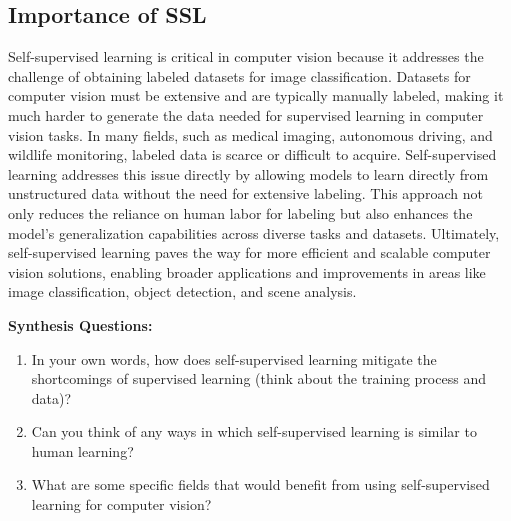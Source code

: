 \subsection{Importance of SSL}
\begin{flushleft}
    \large Self-supervised learning is critical in computer vision because it addresses the challenge of obtaining labeled datasets for image classification. Datasets for computer vision must be extensive and are typically manually labeled, making it much harder to generate the data needed for supervised learning in computer vision tasks. In many fields, such as medical imaging, autonomous driving, and wildlife monitoring, labeled data is scarce or difficult to acquire. Self-supervised learning addresses this issue directly by allowing models to learn directly from unstructured data without the need for extensive labeling. This approach not only reduces the reliance on human labor for labeling but also enhances the model's generalization capabilities across diverse tasks and datasets. Ultimately, self-supervised learning paves the way for more efficient and scalable computer vision solutions, enabling broader applications and improvements in areas like image classification, object detection, and scene analysis.
\end{flushleft}

\vspace{10bp}
\begin{questionbox}
    \textbf{Synthesis Questions:}
    \begin{enumerate}    
        \item In your own words, how does self-supervised learning mitigate the shortcomings of supervised learning (think about the training process and data)?
        \item Can you think of any ways in which self-supervised learning is similar to human learning?
        \item What are some specific fields that would benefit from using self-supervised learning for computer vision?
    \end{enumerate}
    \vspace{1bp}
\end{questionbox}

